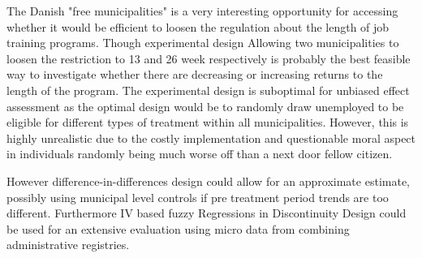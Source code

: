 \label{sec:conclusion}
The Danish "free municipalities" is a very interesting opportunity for accessing whether it would be efficient to loosen the regulation about the length of job training programs. Though experimental design Allowing two municipalities to loosen the restriction to 13 and 26 week respectively is probably the best feasible way to investigate whether there are decreasing or increasing returns to the length of the program. The experimental design is suboptimal for unbiased effect assessment as the optimal design would be to randomly draw unemployed to be eligible for different types of treatment within all municipalities. However, this is highly unrealistic due to the costly implementation and questionable moral aspect in individuals randomly being much worse off than a next door fellow citizen.

However difference-in-differences design could allow for an approximate estimate, possibly using municipal level controls if pre treatment period trends are too different. Furthermore IV based fuzzy Regressions in Discontinuity Design could be used for an extensive evaluation using micro data from combining administrative registries.
